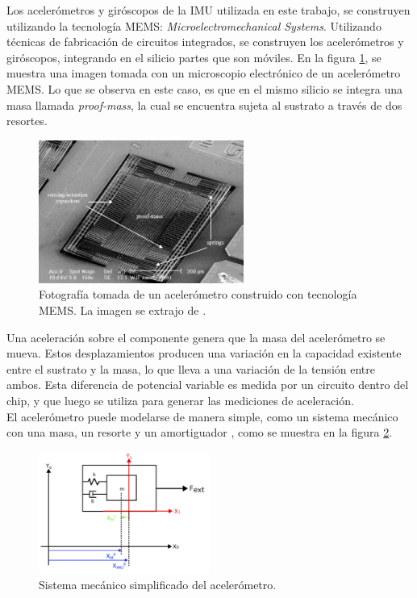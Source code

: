 Los acelerómetros y giróscopos de la IMU utilizada en este trabajo, se construyen utilizando la tecnología MEMS: \textit{Microelectromechanical Systems}. Utilizando técnicas de fabricación de circuitos integrados, se construyen los acelerómetros y giróscopos, integrando en el silicio partes que son móviles. En la figura \ref{fig:MEMS_acelerometro}, se muestra una imagen tomada con un microscopio electrónico de un acelerómetro MEMS. Lo que se observa en este caso, es que en el mismo silicio se integra una masa llamada \textit{proof-mass}, la cual se encuentra sujeta al sustrato a través de dos resortes.

\begin{figure}[H]
    \centering
    \includegraphics[width=0.6\textwidth]{img/MEMS_acelerometro.png}
    \caption{Fotografía tomada de un acelerómetro construido con tecnología MEMS. La imagen se extrajo de \cite{zhang2010sensing}. }
    \label{fig:MEMS_acelerometro}    
\end{figure}

Una aceleración sobre el componente genera que la masa del acelerómetro se mueva. Estos desplazamientos producen una variación en la capacidad existente entre el sustrato y la masa, lo que lleva a una variación de la tensión entre ambos. Esta diferencia de potencial variable es medida por un circuito dentro del chip, y que luego se utiliza para generar las mediciones de aceleración.\\

El acelerómetro puede modelarse de manera simple, como un sistema mecánico con una masa, un resorte y un amortiguador \cite{zhang2010sensing}, como se muestra en la figura \ref{fig:acelerometro_modelo}.

\begin{figure}[H]
    \centering
    \includegraphics[width=0.5\textwidth]{img/acelerometro_modelo.png}
    \caption{Sistema mecánico simplificado del acelerómetro.}
    \label{fig:acelerometro_modelo}    
\end{figure}


